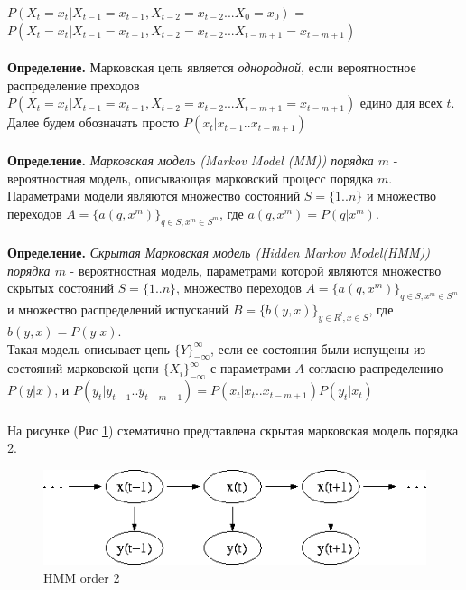 \documentclass[10pt,a4paper]{article}
\begin{document}
$ P(X_{t} = x_{t}|X_{t-1}=x_{t-1},X_{t-2}=x_{t-2} ... X_{0}=x_{0})$ = 
$ P(X_{t} = x_{t}|X_{t-1}=x_{t-1},X_{t-2}=x_{t-2} ... X_{t-m+1}=x_{t-m+1}) $ 
\\\\
\textbf{Определение.} Марковская цепь является \textit{однородной}, если вероятностное распределение преходов $P(X_{t} = x_{t}|X_{t-1}=x_{t-1},X_{t-2}=x_{t-2} ... X_{t-m+1}=x_{t-m+1})$ едино для всех $ t $.
\\
Далее будем обозначать просто $ P(x_{t}|x_{t-1}..x_{t-m+1})$
\\\\
\textbf{Определение.} \emph{Марковская модель (Markov Model (MM)) порядка $ m $} - вероятностная модель, описывающая марковский процесс порядка $ m $.
Параметрами модели являются множество состояний $ S = \{1..n\} $ и множество переходов $ A = \{a(q, x^{m})\}_{q \in S, x^{m} \in S^{m}}$, где $a(q, x^{m}) = P(q|x^{m})$. 
\\\\
\textbf{Определение.} \emph{Скрытая Марковская модель (Hidden Markov Model(HMM)) порядка $ m $} - вероятностная модель, параметрами которой являются множество скрытых состояний $ S = \{1..n\} $, множество переходов $ A = \{a(q, x^{m})\}_{q \in S, x^{m} \in S^{m}}$ и множество распределений испусканий $ B = \{b(y,x)\}_{y \in R^{l}, x \in S}$, где $ b(y, x) = P(y|x)$. 
\\
Такая модель описывает цепь $\{Y\}_{-\infty}^{\infty}$, если ее состояния были испущены из состояний марковской цепи $\{X_{i}\}_{-\infty}^{\infty}$ с параметрами $ A $ согласно распределению $ P(y|x) $, и $ P(y_{t}|y_{t-1}..y_{t-m+1}) = P(x_{t}|x_{t}..x_{t-m+1})P(y_t|x_t)$  
\\\\
На рисунке (Рис \ref{ris:image}) схематично представлена скрытая марковская модель порядка 2.
\\
\begin{figure}[hbtp]
\includegraphics[scale=0.4]{img/Hmm_temporal_bayesian_net.png}
\centering
\caption{HMM order 2}
\label{ris:image}
\end{figure}
\\\\
\end{document}
